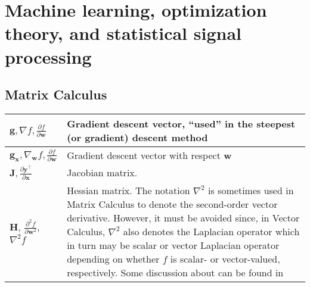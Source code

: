 \section{Machine learning, optimization theory, and \newline statistical signal processing}
\subsection{Matrix Calculus}
\begin{xltabular}{\textwidth}{XX}
	\(\mathbf{g}, \nabla f, \frac{\partial f}{\partial \mathbf{w}}\)                                                       & Gradient descent vector, ``used'' in the steepest (or gradient) descent method                                                                                                                                                                                                                                                                                                                                                             \\ \hline
	\(\mathbf{g}_{\mathbf{x}}, \nabla_{\mathbf{w}}f, \frac{\partial f}{\partial \mathbf{w}}\)                              & Gradient descent vector with respect \(\mathbf{w}\) \cite{bishopPatternRecognitionMachine2006}                                                                                                                                                                                                                                                                                                                                             \\ \hline
	\(\mathbf{J}, \frac{\partial \mathbf{y}^{\top}}{\partial \mathbf{x}}\)                                                 & Jacobian matrix.                                                                                                                                                                                                                                                                                                                                                                                                                           \\ \hline
	\(\mathbf{H}\), \(\frac{\partial^2 f}{\partial \mathbf{w}^2}\), \(\nabla^2 f\) \cite{haykinNeuralNetworksLearning2009} & Hessian matrix. The notation \(\nabla^2\) is sometimes used in Matrix Calculus to denote the second-order vector derivative. However, it must be avoided since, in Vector Calculus, \(\nabla^2\) also denotes the Laplacian operator which in turn may be scalar or vector Laplacian operator depending on whether \(f\) is scalar- or vector-valued, respectively. Some discussion about can be found in \cite{4693212, 1353761, 4560326} \\ \hline
\end{xltabular}
